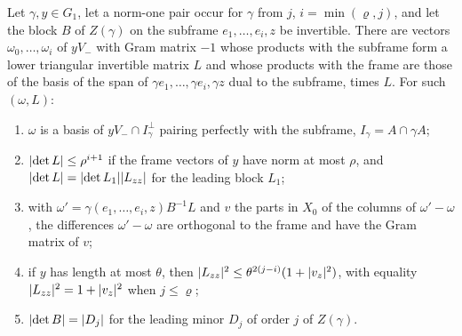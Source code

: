 \begin{lemma}\label{lem:triangular-basis}
Let $\gamma,y\in G_1$, let a norm-one pair occur for $\gamma$ from $j$, $i=\min(\varrho,j)$, and let the block $B$ of $Z(\gamma)$ on the subframe $e_1,\dots,e_i,z$ be invertible. There are vectors
$\omega_0,\dots,\omega_i$ of $yV_-$ with Gram matrix $-1$ whose products with the subframe form a lower triangular invertible matrix $L$ and whose products with the frame are those of the basis of the span
of $\gamma e_1,\dots,\gamma e_i,\gamma z$ dual to the subframe, times $L$. For such $(\omega,L)$:
\begin{enumerate}[label=\textup{(\alph*)}]
\item $\omega$ is a basis of $yV_-\cap I_\gamma^\perp$ pairing perfectly with the subframe, $I_\gamma=A\cap\gamma A$;
\item $\lvert \det L\rvert\le\rho^{i+1}$ if the frame vectors of $y$ have norm at most $\rho$, and $\lvert \det L\rvert=\lvert \det L_1\rvert\lvert L_{zz}\rvert$ for the leading block $L_1$;
\item with $\omega'=\gamma(e_1,\dots,e_i,z)B^{-1}L$ and $v$ the parts in $X_0$ of the columns of $\omega'-\omega$, the differences $\omega'-\omega$ are orthogonal to the frame and have the Gram matrix of $v$;
\item if $y$ has length at most $\theta$, then $\lvert L_{zz}\rvert^2\le\theta^{2(j-i)}(1+\lvert v_z\rvert^2)$, with equality $\lvert L_{zz}\rvert^2=1+\lvert v_z\rvert^2$ when $j\le\varrho$;
\item $\lvert \det B\rvert=\lvert D_j\rvert$ for the leading minor $D_j$ of order $j$ of $Z(\gamma)$.
\end{enumerate}
\end{lemma}

